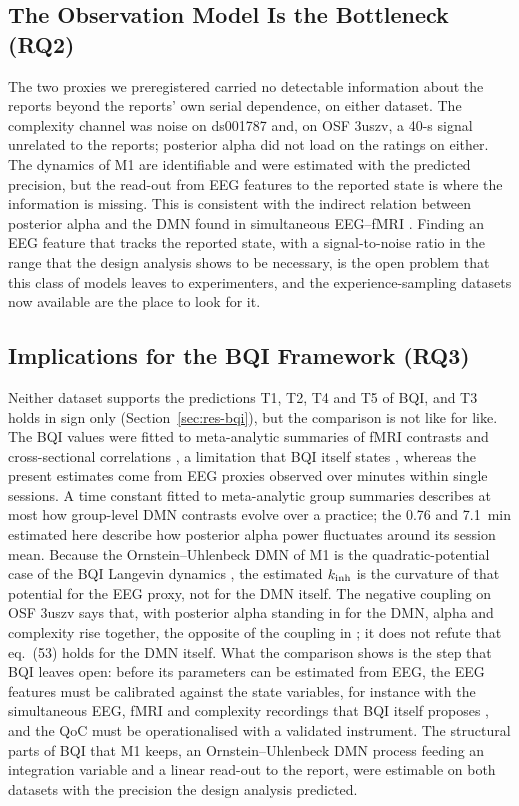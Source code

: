 \subsection{The Observation Model Is the Bottleneck (RQ2)}
The two proxies we preregistered carried no detectable information about the reports beyond the reports' own serial dependence, on either dataset. The complexity channel was noise on ds001787 and, on OSF 3uszv, a 40-s signal unrelated to the reports; posterior alpha did not load on the ratings on either. The dynamics of M1 are identifiable and were estimated with the predicted precision, but the read-out from EEG features to the reported state is where the information is missing. This is consistent with the indirect relation between posterior alpha and the DMN found in simultaneous EEG--fMRI \cite{Laufs2003,Mantini2007}. Finding an EEG feature that tracks the reported state, with a signal-to-noise ratio in the range that the design analysis shows to be necessary, is the open problem that this class of models leaves to experimenters, and the experience-sampling datasets now available \cite{Weinstein2018,Brandmeyer2018,RodriguezLarios2021} are the place to look for it.

\subsection{Implications for the BQI Framework (RQ3)}
Neither dataset supports the predictions T1, T2, T4 and T5 of BQI, and T3 holds in sign only (Section~\ref{sec:res-bqi}), but the comparison is not like for like. The BQI values were fitted to meta-analytic summaries of fMRI contrasts and cross-sectional correlations \cite[Sec.~7.2--7.5]{BQI}, a limitation that BQI itself states \cite[Sec.~11.3]{BQI}, whereas the present estimates come from EEG proxies observed over minutes within single sessions. A time constant fitted to meta-analytic group summaries describes at most how group-level DMN contrasts evolve over a practice; the 0.76 and 7.1~min estimated here describe how posterior alpha power fluctuates around its session mean. Because the Ornstein--Uhlenbeck DMN of M1 is the quadratic-potential case of the BQI Langevin dynamics \cite[eqs.~(83)--(87)]{BQI}, the estimated $k_{\mathrm{inh}}$ is the curvature of that potential for the EEG proxy, not for the DMN itself. The negative coupling on OSF 3uszv says that, with posterior alpha standing in for the DMN, alpha and complexity rise together, the opposite of the coupling in \cite[eq.~(53)]{BQI}; it does not refute that eq.~(53) holds for the DMN itself. What the comparison shows is the step that BQI leaves open: before its parameters can be estimated from EEG, the EEG features must be calibrated against the state variables, for instance with the simultaneous EEG, fMRI and complexity recordings that BQI itself proposes \cite[Sec.~14]{BQI}, and the QoC must be operationalised with a validated instrument. The structural parts of BQI that M1 keeps, an Ornstein--Uhlenbeck DMN process feeding an integration variable and a linear read-out to the report, were estimable on both datasets with the precision the design analysis predicted.


